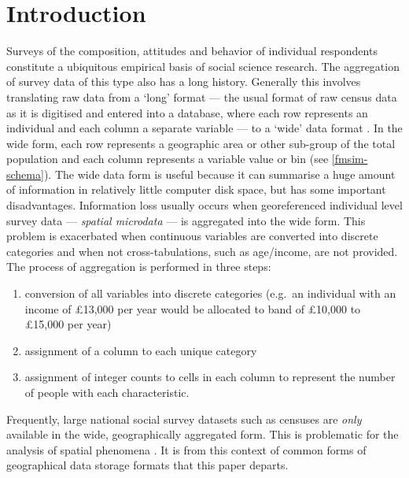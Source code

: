 \documentclass[a4paper,10pt]{article}
\begin{document}
\section{Introduction}
Surveys of the composition, attitudes and behavior of individual
respondents constitute a ubiquitous empirical basis of social science research.
The aggregation of survey data of this type also has a long history.
Generally this involves translating raw data from a `long' format
--- the usual format of raw census data as it is digitised and entered into a database,
where each row represents an individual and each column a separate variable ---
to a `wide' data format \citep[Chapter 9]{van2012flexible}. In the wide form,
each row represents a geographic area or other sub-group of
the total population and each column represents a
variable value or bin (see \cref{fmsim-schema}). The wide data form is useful because
it can summarise a huge amount of information
in relatively little computer disk space, but has some important disadvantages. 
Information loss usually occurs when georeferenced individual level survey data
--- \emph{spatial microdata} --- is aggregated into the wide form. This
problem is exacerbated when continuous variables
are converted into discrete categories and 
when not cross-tabulations, such as age/income, are not provided.
The process of aggregation is performed in three steps:
\begin{enumerate}
 \item conversion of all
variables into discrete categories (e.g.~an individual with an income of £13,000 per year
would be allocated to band of £10,000 to £15,000 per year)
 \item assignment of a column to each unique category
 \item assignment of
integer counts to cells in each column to represent the number of people with each characteristic.
\end{enumerate}
Frequently, large national social survey datasets 
such as censuses are \emph{only} available in the wide, geographically aggregated
form. This is problematic for the analysis of spatial phenomena \citep{Openshaw1984,Lee2009}.
It is from this context of common forms of geographical data storage formats that this paper departs.
\end{document}
